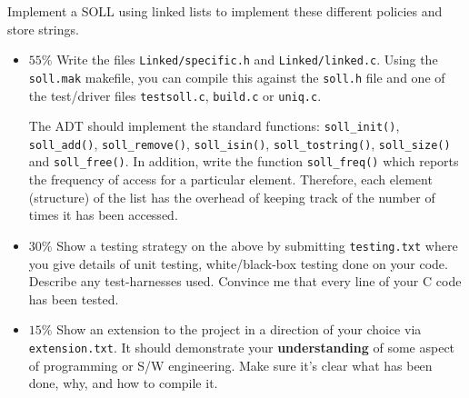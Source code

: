 \begin{exercise}

Implement a SOLL using linked lists to implement these different policies
and store strings.

\begin{itemize}
\item {\bf $55\%$}
Write the files \verb^Linked/specific.h^ and \verb^Linked/linked.c^.
Using the \verb^soll.mak^ makefile, you can compile this against the
\verb^soll.h^ file and one of the test/driver files \verb^testsoll.c^,
\verb^build.c^ or \verb^uniq.c^.

The ADT should implement the standard functions: \verb^soll_init()^,
\verb^soll_add()^, \verb^soll_remove()^, \verb^soll_isin()^,
\verb^soll_tostring()^, \verb^soll_size()^ and \verb^soll_free()^.
In addition, write the function \verb^soll_freq()^ which reports
the frequency of access for a particular element.
Therefore, each element (structure) of the list has the
overhead of keeping track of the number of times it has been accessed.

\item {\bf $30\%$}
Show a testing strategy on the above by submitting \verb^testing.txt^
where you give details of
unit testing, white/black-box testing done on your code. Describe any
test-harnesses used. Convince me that every line of your C code
has been tested.

\item {\bf $15\%$}
Show an extension to the project in a direction of
your choice via \verb^extension.txt^.
It should demonstrate your {\bf understanding} of some aspect
of programming or S/W engineering. Make sure it's clear what has been
done, why, and how to compile it.
\end{itemize}

\end{exercise}
